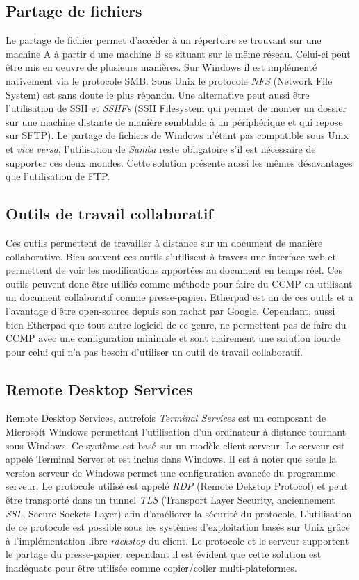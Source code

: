 \subsection{Partage de fichiers}
Le partage de fichier permet d'accéder à un répertoire se trouvant sur
une machine A à partir d'une machine B se situant sur le même réseau.
Celui-ci peut être mis en oeuvre de plusieurs manières. Sur Windows
il est implémenté nativement via le protocole SMB. Sous Unix le protocole
\emph{NFS} (Network File System) est sans doute le plus répandu.
Une alternative peut aussi être l'utilisation de SSH et \emph{SSHFs}
(SSH Filesystem qui permet de monter un dossier sur une machine distante
de manière semblable à un périphérique et qui repose sur SFTP). Le partage de
fichiers de Windows n'étant pas compatible sous Unix et \emph{vice versa},
l'utilisation de \emph{Samba} \cite{samba} reste obligatoire s'il est
nécessaire de supporter ces deux mondes. Cette solution présente aussi les
mêmes désavantages que l'utilisation de FTP.

\subsection{Outils de travail collaboratif}
Ces outils permettent de travailler à distance sur un document de manière
collaborative. Bien souvent ces outils s'utilisent à travers une interface
web et permettent de voir les modifications apportées au document en temps
réel. Ces outils peuvent donc être utiliés comme méthode pour faire du CCMP
en utilisant un document collaboratif comme presse-papier.
Etherpad\cite{etherpad} est un de ces outils et a l'avantage d'être
open-source depuis son rachat par Google.
Cependant, aussi bien Etherpad que tout autre logiciel de ce genre, ne
permettent pas de faire du CCMP avec une configuration minimale et sont
clairement une solution lourde pour celui qui n'a pas besoin d'utiliser un
outil de travail collaboratif.

\subsection{Remote Desktop Services}
Remote Desktop Services, autrefois \emph{Terminal Services}
est un composant de Microsoft Windows permettant l'utilisation
d'un ordinateur à distance tournant sous Windows\cite{wiki:rds}.
Ce système est basé sur un modèle client-serveur.
Le serveur est appelé Terminal Server et est inclus dans Windows.
Il est à noter que seule la version serveur
de Windows permet une configuration avancée du programme serveur.
Le protocole utilisé est appelé \emph{RDP} (Remote Dekstop Protocol) et
peut être transporté dans un tunnel \emph{TLS} (Transport Layer Security,
anciennement \emph{SSL}, Secure Sockets Layer) afin d'améliorer la sécurité
du protocole. L'utilisation de ce protocole est possible sous les
systèmes d'exploitation basés sur Unix grâce à l'implémentation
libre \emph{rdekstop} \cite{rdesktop} du client. Le protocole et le serveur
supportent le partage du presse-papier, cependant il est évident que cette
solution est inadéquate pour être utilisée comme copier/coller
multi-plateformes.

